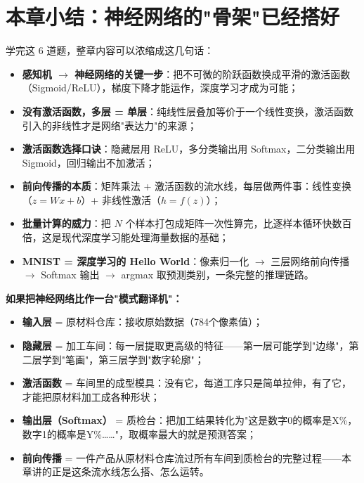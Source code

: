 \documentclass[a4paper,11pt]{ctexart}
\begin{document}
\section{本章小结：神经网络的"骨架"已经搭好}

学完这 6 道题，整章内容可以浓缩成这几句话：

\begin{itemize}
    \item \textbf{感知机 $\to$ 神经网络的关键一步}：把不可微的阶跃函数换成平滑的激活函数（Sigmoid/ReLU），梯度下降才能运作，深度学习才成为可能；
    \item \textbf{没有激活函数，多层 = 单层}：纯线性层叠加等价于一个线性变换，激活函数引入的非线性才是网络"表达力"的来源；
    \item \textbf{激活函数选择口诀}：隐藏层用 ReLU，多分类输出用 Softmax，二分类输出用 Sigmoid，回归输出不加激活；
    \item \textbf{前向传播的本质}：矩阵乘法 + 激活函数的流水线，每层做两件事：线性变换（$z=Wx+b$）+ 非线性激活（$h=f(z)$）；
    \item \textbf{批量计算的威力}：把 $N$ 个样本打包成矩阵一次性算完，比逐样本循环快数百倍，这是现代深度学习能处理海量数据的基础；
    \item \textbf{MNIST = 深度学习的 Hello World}：像素归一化 $\to$ 三层网络前向传播 $\to$ Softmax 输出 $\to$ argmax 取预测类别，一条完整的推理链路。
\end{itemize}

\begin{metaphorbox}[给零基础读者的一句总比喻]
    \textbf{如果把神经网络比作一台"模式翻译机"：}
    \begin{itemize}
        \item \textbf{输入层} = 原材料仓库：接收原始数据（784个像素值）；
        \item \textbf{隐藏层} = 加工车间：每一层提取更高级的特征——第一层可能学到"边缘"，第二层学到"笔画"，第三层学到"数字轮廓"；
        \item \textbf{激活函数} = 车间里的成型模具：没有它，每道工序只是简单拉伸，有了它，才能把原材料加工成各种形状；
        \item \textbf{输出层（Softmax）} = 质检台：把加工结果转化为"这是数字0的概率是X\%，数字1的概率是Y\%……"，取概率最大的就是预测答案；
        \item \textbf{前向传播} = 一件产品从原材料仓库流过所有车间到质检台的完整过程——本章讲的正是这条流水线怎么搭、怎么运转。
    \end{itemize}
\end{metaphorbox}
\end{document}
